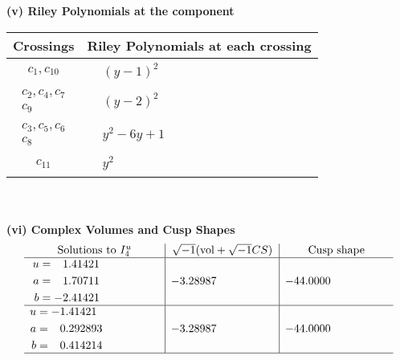 \documentclass[1p]{elsarticle_modified}
\theoremstyle{definition}
\newcommand{\I}{\sqrt{-1}}
\begin{document}
\newpage\renewcommand{\arraystretch}{1}
\flushleft \textbf{(v) Riley Polynomials at the component}\newline \\
\begin{tabular}{m{50pt}|m{274pt}}
Crossings & \hspace{64pt}Riley Polynomials at each crossing \\
\hline $$\begin{aligned}c_{1},c_{10}\end{aligned}$$&$\begin{aligned}
&(y-1)^2
\end{aligned}$\\
\hline $$\begin{aligned}c_{2},c_{4},c_{7}\\c_{9}\end{aligned}$$&$\begin{aligned}
&(y-2)^2
\end{aligned}$\\
\hline $$\begin{aligned}c_{3},c_{5},c_{6}\\c_{8}\end{aligned}$$&$\begin{aligned}
&y^2-6 y+1
\end{aligned}$\\
\hline $$\begin{aligned}c_{11}\end{aligned}$$&$\begin{aligned}
&y^2
\end{aligned}$\\
\hline
\end{tabular}\\~\\
\newpage\flushleft \textbf{(vi) Complex Volumes and Cusp Shapes}
$$\begin{array}{c|c|c}  
\text{Solutions to }I^u_{4}& \I (\text{vol} + \sqrt{-1}CS) & \text{Cusp shape}\\
 \hline 
\begin{aligned}
u &= \phantom{-}1.41421\phantom{ +0.000000I} \\
a &= \phantom{-}1.70711\phantom{ +0.000000I} \\
b &= -2.41421\phantom{ +0.000000I}\end{aligned}
 & -3.28987\phantom{ +0.000000I} & -44.0000\phantom{ +0.000000I} \\ \hline\begin{aligned}
u &= -1.41421\phantom{ +0.000000I} \\
a &= \phantom{-}0.292893\phantom{ +0.000000I} \\
b &= \phantom{-}0.414214\phantom{ +0.000000I}\end{aligned}
 & -3.28987\phantom{ +0.000000I} & -44.0000\phantom{ +0.000000I}\\
 \hline 
 \end{array}$$\newpage\newpage\renewcommand{\arraystretch}{1}
\end{document}
